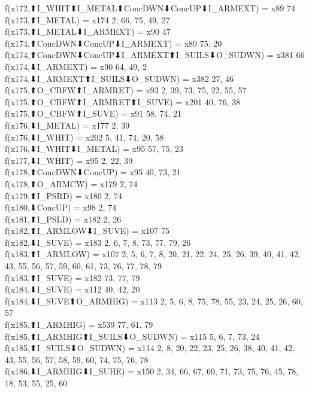 f(x172,⬆I_WHIT⬆I_METAL⬆ConcDWN⬇ConcUP⬇I_ARMEXT) = x89 {74} \\
f(x173,⬆I_METAL) = x174 {2, 66, 75, 49, 27} \\
f(x173,⬆I_METAL⬇I_ARMEXT) = x90 {47} \\
f(x174,⬆ConcDWN⬇ConcUP⬇I_ARMEXT) = x89 {75, 20} \\
f(x174,⬆ConcDWN⬇ConcUP⬇I_ARMEXT⬆I_SUILS⬇O_SUDWN) = x381 {66} \\
f(x174,⬇I_ARMEXT) = x90 {64, 49, 2} \\
f(x174,⬇I_ARMEXT⬆I_SUILS⬇O_SUDWN) = x382 {27, 46} \\
f(x175,⬆O_CBFW⬆I_ARMRET) = x93 {2, 39, 73, 75, 22, 55, 57} \\
f(x175,⬆O_CBFW⬆I_ARMRET⬆I_SUVE) = x201 {40, 76, 38} \\
f(x175,⬆O_CBFW⬆I_SUVE) = x91 {58, 74, 21} \\
f(x176,⬇I_METAL) = x177 {2, 39} \\
f(x176,⬇I_WHIT) = x202 {5, 41, 74, 20, 58} \\
f(x176,⬇I_WHIT⬇I_METAL) = x95 {57, 75, 23} \\
f(x177,⬇I_WHIT) = x95 {2, 22, 39} \\
f(x178,⬆ConcDWN⬇ConcUP) = x95 {40, 73, 21} \\
f(x178,⬆O_ARMCW) = x179 {2, 74} \\
f(x179,⬆I_PSRD) = x180 {2, 74} \\
f(x180,⬇ConcUP) = x98 {2, 74} \\
f(x181,⬆I_PSLD) = x182 {2, 26} \\
f(x182,⬆I_ARMLOW⬇I_SUVE) = x107 {75} \\
f(x182,⬇I_SUVE) = x183 {2, 6, 7, 8, 73, 77, 79, 26} \\
f(x183,⬆I_ARMLOW) = x107 {2, 5, 6, 7, 8, 20, 21, 22, 24, 25, 26, 39, 40, 41, 42, 43, 55, 56, 57, 59, 60, 61, 73, 76, 77, 78, 79} \\
f(x183,⬆I_SUVE) = x182 {73, 77, 79} \\
f(x184,⬇I_SUVE) = x112 {40, 42, 20} \\
f(x184,⬇I_SUVE⬆O_ARMHIG) = x113 {2, 5, 6, 8, 75, 78, 55, 23, 24, 25, 26, 60, 57} \\
f(x185,⬆I_ARMHIG) = x539 {77, 61, 79} \\
f(x185,⬆I_ARMHIG⬆I_SUILS⬇O_SUDWN) = x115 {5, 6, 7, 73, 24} \\
f(x185,⬆I_SUILS⬇O_SUDWN) = x114 {2, 8, 20, 22, 23, 25, 26, 38, 40, 41, 42, 43, 55, 56, 57, 58, 59, 60, 74, 75, 76, 78} \\
f(x186,⬇I_ARMHIG⬇I_SUHE) = x150 {2, 34, 66, 67, 69, 71, 73, 75, 76, 45, 78, 18, 53, 55, 25, 60} \\
